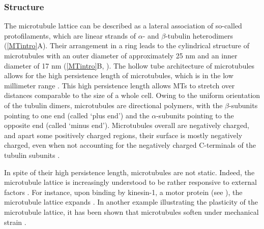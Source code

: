 \subsubsection{Structure}
The microtubule lattice can be described as a lateral association of so-called protofilaments, which are linear strands of $\alpha$- and $\beta$-tubulin heterodimers (\autoref{MTintro}A). Their arrangement in a ring leads to the cylindrical structure of microtubules with an outer diameter of approximately 25 nm and an inner diameter of 17 nm (\autoref{MTintro}B, ). The hollow tube architecture of microtubules allows for the high persistence length of microtubules, which is in the low millimeter range \parencite{Hawkins2010}. This high persistence length allows MTs to stretch over distances comparable to the size of a whole cell. Owing to the uniform orientation of the tubulin dimers, microtubules are directional polymers, with the $\beta$-subunits pointing to one end (called ‘plus end’) and the $\alpha$-subunits pointing to the opposite end (called ‘minus end’). Microtubules overall are negatively charged, and apart some positively charged regions, their surface is mostly negatively charged, even when not accounting for the negatively charged C-terminals of the tubulin subunits .\par

In spite of their high persistence length, microtubules are not static. Indeed, the microtubule lattice is increasingly understood to be rather responsive to external factors . For instance, upon binding by kinesin-1, a motor protein (see ), the microtubule lattice expands . In another example illustrating the plasticity of the microtubule lattice, it has been shown that microtubules soften under mechanical strain . \par

